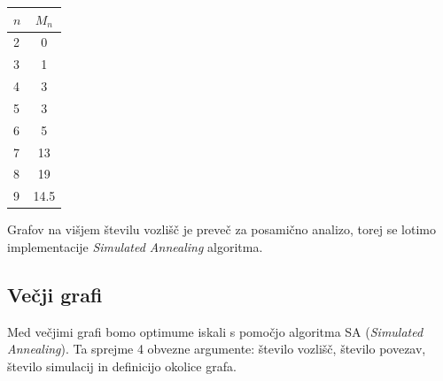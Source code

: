 \documentclass[ letterpaper, titlepage, fleqn]{article}
\begin{document}
\begin{center}
    \begin{tabular}{ l | c }
      $n$ & $M_n$ \\ \hline
      2 & 0 \\ 
      3 & 1 \\ 
      4 & 3 \\ 
      5 & 3 \\ 
      6 & 5 \\ 
      7 & 13 \\ 
      8 & 19 \\ 
      9 & 14.5 \\ 
    \end{tabular}
\end{center}

Grafov na višjem številu vozlišč je preveč za posamično analizo, torej
se lotimo implementacije {\em Simulated Annealing} algoritma.

\subsection{Večji grafi}

Med večjimi grafi bomo optimume iskali s pomočjo algoritma SA ({\em Simulated Annealing}). 
Ta sprejme 4 obvezne argumente: število vozlišč, število povezav, število simulacij in definicijo okolice grafa.
\end{document}
